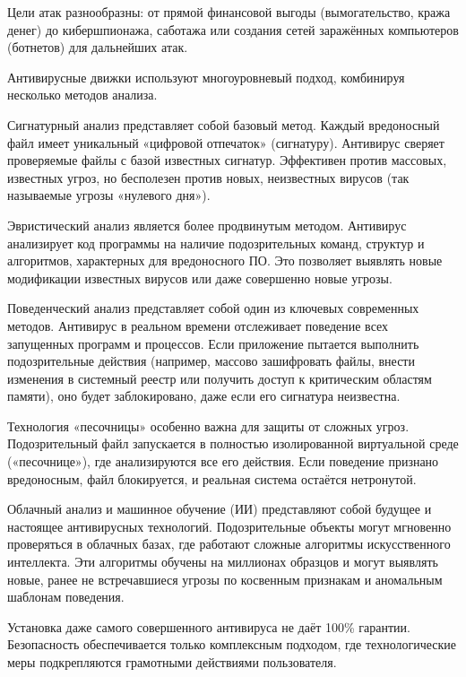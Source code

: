 \documentclass{SibFU-docs}
\begin{document}
\vspace{1em}

Цели атак разнообразны: от прямой финансовой выгоды (вымогательство, кража денег) до кибершпионажа, саботажа или создания сетей заражённых компьютеров (ботнетов) для дальнейших атак.


Антивирусные движки используют многоуровневый подход, комбинируя несколько методов анализа.

Сигнатурный анализ представляет собой базовый метод. Каждый вредоносный файл имеет уникальный «цифровой отпечаток» (сигнатуру). Антивирус сверяет проверяемые файлы с базой известных сигнатур. Эффективен против массовых, известных угроз, но бесполезен против новых, неизвестных вирусов (так называемые угрозы «нулевого дня»).

Эвристический анализ является более продвинутым методом. Антивирус анализирует код программы на наличие подозрительных команд, структур и алгоритмов, характерных для вредоносного ПО. Это позволяет выявлять новые модификации известных вирусов или даже совершенно новые угрозы.

Поведенческий анализ представляет собой один из ключевых современных методов. Антивирус в реальном времени отслеживает поведение всех запущенных программ и процессов. Если приложение пытается выполнить подозрительные действия (например, массово зашифровать файлы, внести изменения в системный реестр или получить доступ к критическим областям памяти), оно будет заблокировано, даже если его сигнатура неизвестна.

Технология «песочницы» особенно важна для защиты от сложных угроз. Подозрительный файл запускается в полностью изолированной виртуальной среде («песочнице»), где анализируются все его действия. Если поведение признано вредоносным, файл блокируется, и реальная система остаётся нетронутой.

Облачный анализ и машинное обучение (ИИ) представляют собой будущее и настоящее антивирусных технологий. Подозрительные объекты могут мгновенно проверяться в облачных базах, где работают сложные алгоритмы искусственного интеллекта. Эти алгоритмы обучены на миллионах образцов и могут выявлять новые, ранее не встречавшиеся угрозы по косвенным признакам и аномальным шаблонам поведения.


Установка даже самого совершенного антивируса не даёт 100\% гарантии. Безопасность обеспечивается только комплексным подходом, где технологические меры подкрепляются грамотными действиями пользователя.
\end{document}
